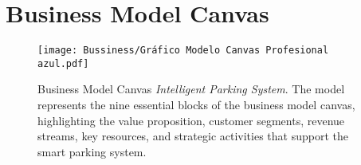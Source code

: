 \section{Business Model Canvas}

\begin{figure}[H]
    \centering
    \texttt{[image: Bussiness/Gráfico Modelo Canvas Profesional azul.pdf]}
    \caption{Business Model Canvas \textit{Intelligent Parking System}.
    The model represents the nine essential blocks of the business model canvas, highlighting the value proposition, customer segments, revenue streams, key resources, and strategic activities that support the smart parking system.}
    \label{fig:business_model_canvas}
\end{figure}
